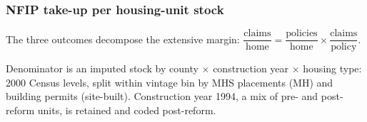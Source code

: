 \documentclass[11pt,xcolor={dvipsnames},hyperref={pdftex,pdfpagemode=UseNone,hidelinks,pdfdisplaydoctitle=true},usepdftitle=false,aspectratio=169]{beamer}
\begin{document}
\begin{frame}\label{frame:take-up}
    \frametitle{NFIP take-up per housing-unit stock}

    \vspace{-0.5em}

    \tiny{
        \begin{table}
        \centering
        \resizebox{.62\linewidth}{!}{}
        \end{table}
    }

    \vspace{0.2em}

    \scriptsize{
    The three outcomes decompose the extensive margin:
    $\dfrac{\text{claims}}{\text{home}} = \dfrac{\text{policies}}{\text{home}} \times \dfrac{\text{claims}}{\text{policy}}$.
    }

    \vspace{0.3em}

    \tiny{Denominator is an imputed stock by county $\times$ construction year $\times$ housing type: 2000 Census levels, split within vintage bin by MHS placements (MH) and building permits (site-built). Construction year 1994, a mix of pre- and post-reform units, is retained and coded post-reform.}

    \vfill

    \hfill \hyperlink{frame:severity}{}
\end{frame}
\end{document}
